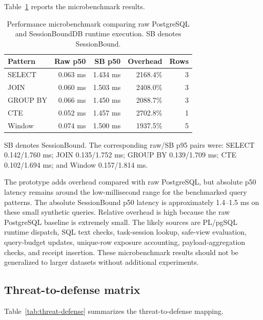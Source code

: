 \documentclass[
]{article}
\begin{document}
Table~\ref{tab:performance} reports the microbenchmark results.

\begin{table}[t]
\centering
\caption{Performance microbenchmark comparing raw PostgreSQL and SessionBoundDB runtime execution. SB denotes SessionBound.}
\label{tab:performance}
\begin{tabular}{@{}lrrrr@{}}
\toprule
Pattern & Raw p50 & SB p50 & Overhead & Rows \\
\midrule
SELECT & 0.063 ms & 1.434 ms & 2168.4\% & 3 \\
JOIN & 0.060 ms & 1.503 ms & 2408.0\% & 3 \\
GROUP BY & 0.066 ms & 1.450 ms & 2088.7\% & 3 \\
CTE & 0.052 ms & 1.457 ms & 2702.8\% & 1 \\
Window & 0.074 ms & 1.500 ms & 1937.5\% & 5 \\
\bottomrule
\end{tabular}
\end{table}

SB denotes SessionBound. The corresponding raw/SB p95 pairs were: SELECT
0.142/1.760 ms; JOIN 0.135/1.752 ms; GROUP BY 0.139/1.709 ms; CTE
0.102/1.694 ms; and Window 0.157/1.814 ms.

The prototype adds overhead compared with raw PostgreSQL, but absolute
p50 latency remains around the low-millisecond range for the benchmarked
query patterns. The absolute SessionBound p50 latency is approximately
1.4--1.5 ms on these small synthetic queries. Relative overhead is high
because the raw PostgreSQL baseline is extremely small. The likely
sources are PL/pgSQL runtime dispatch, SQL text checks, task-session
lookup, safe-view evaluation, query-budget updates, unique-row exposure
accounting, payload-aggregation checks, and receipt insertion. These
microbenchmark results should not be generalized to larger datasets
without additional experiments.

\hypertarget{threat-to-defense-matrix}{%
\subsection{Threat-to-defense
matrix}\label{threat-to-defense-matrix}}

Table~\ref{tab:threat-defense} summarizes the threat-to-defense
mapping.
\end{document}
